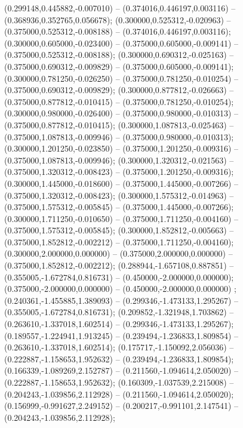  (0.299148,0.445882,-0.007010) -- (0.374016,0.446197,0.003116) -- (0.368936,0.352765,0.056678);
 (0.300000,0.525312,-0.020963) -- (0.375000,0.525312,-0.008188) -- (0.374016,0.446197,0.003116);
 (0.300000,0.605000,-0.023400) -- (0.375000,0.605000,-0.009141) -- (0.375000,0.525312,-0.008188);
 (0.300000,0.690312,-0.025163) -- (0.375000,0.690312,-0.009829) -- (0.375000,0.605000,-0.009141);
 (0.300000,0.781250,-0.026250) -- (0.375000,0.781250,-0.010254) -- (0.375000,0.690312,-0.009829);
 (0.300000,0.877812,-0.026663) -- (0.375000,0.877812,-0.010415) -- (0.375000,0.781250,-0.010254);
 (0.300000,0.980000,-0.026400) -- (0.375000,0.980000,-0.010313) -- (0.375000,0.877812,-0.010415);
 (0.300000,1.087813,-0.025463) -- (0.375000,1.087813,-0.009946) -- (0.375000,0.980000,-0.010313);
 (0.300000,1.201250,-0.023850) -- (0.375000,1.201250,-0.009316) -- (0.375000,1.087813,-0.009946);
 (0.300000,1.320312,-0.021563) -- (0.375000,1.320312,-0.008423) -- (0.375000,1.201250,-0.009316);
 (0.300000,1.445000,-0.018600) -- (0.375000,1.445000,-0.007266) -- (0.375000,1.320312,-0.008423);
 (0.300000,1.575312,-0.014963) -- (0.375000,1.575312,-0.005845) -- (0.375000,1.445000,-0.007266);
 (0.300000,1.711250,-0.010650) -- (0.375000,1.711250,-0.004160) -- (0.375000,1.575312,-0.005845);
 (0.300000,1.852812,-0.005663) -- (0.375000,1.852812,-0.002212) -- (0.375000,1.711250,-0.004160);
 (0.300000,2.000000,0.000000) -- (0.375000,2.000000,0.000000) -- (0.375000,1.852812,-0.002212);
 (0.288944,-1.657108,0.887851) -- (0.355005,-1.672784,0.816731) -- (0.450000,-2.000000,0.000000);
 (0.375000,-2.000000,0.000000) -- (0.450000,-2.000000,0.000000) ;
 (0.240361,-1.455885,1.389093) -- (0.299346,-1.473133,1.295267) -- (0.355005,-1.672784,0.816731);
 (0.209852,-1.321948,1.703862) -- (0.263610,-1.337018,1.602514) -- (0.299346,-1.473133,1.295267);
 (0.189557,-1.224941,1.913245) -- (0.239494,-1.236833,1.809854) -- (0.263610,-1.337018,1.602514);
 (0.175717,-1.150092,2.056036) -- (0.222887,-1.158653,1.952632) -- (0.239494,-1.236833,1.809854);
 (0.166339,-1.089269,2.152787) -- (0.211560,-1.094614,2.050020) -- (0.222887,-1.158653,1.952632);
 (0.160309,-1.037539,2.215008) -- (0.204243,-1.039856,2.112928) -- (0.211560,-1.094614,2.050020);
 (0.156999,-0.991627,2.249152) -- (0.200217,-0.991101,2.147541) -- (0.204243,-1.039856,2.112928);
